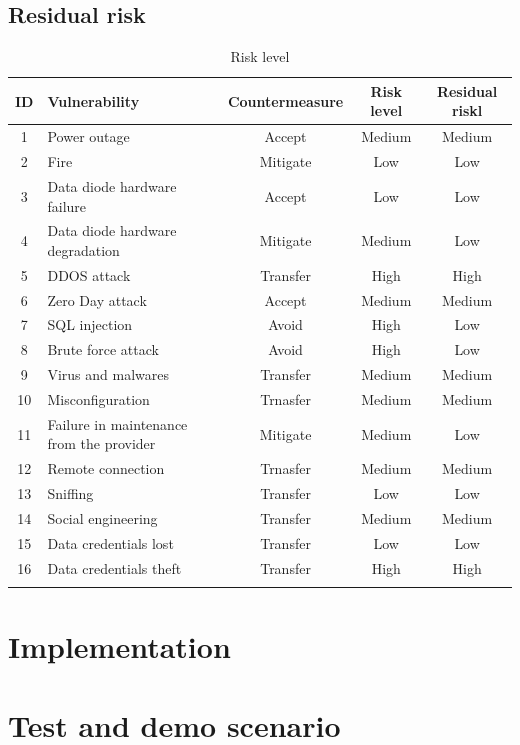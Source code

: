 \documentclass[a4paper,10pt]{article}
\begin{document}
\subsection{Residual risk}

\begin{longtable}{|c|p{4cm}|c|c|c|}
	\hline
	\textbf{ID}& \textbf{Vulnerability}  & \textbf{Countermeasure} & \textbf{Risk level} & \textbf{Residual riskl}          \\
	\hline
	1 & Power outage & Accept & Medium & Medium \\
	\hline
	2 & Fire  & Mitigate & Low & Low \\
	\hline
	3 & Data diode hardware failure & Accept & Low & Low \\
	\hline
	4 & Data diode hardware degradation & Mitigate & Medium & Low  \\
	\hline
	5 & DDOS attack & Transfer & High & High \\
	\hline
	6 & Zero Day attack & Accept & Medium & Medium \\
	\hline
	7 &  SQL injection & Avoid & High & Low \\
	\hline
	8 & Brute force attack & Avoid & High & Low \\
	\hline
	9 & Virus and malwares & Transfer & Medium & Medium \\
	\hline
	10 & Misconfiguration & Trnasfer & Medium & Medium \\
	\hline
	11 & Failure in maintenance from the provider & Mitigate & Medium & Low \\
	\hline
	12 & Remote connection & Trnasfer & Medium & Medium\\
	\hline
	13 & Sniffing & Transfer & Low & Low \\
	\hline
	14 & Social engineering & Transfer & Medium & Medium \\
	\hline
	15 & Data credentials lost & Transfer & Low & Low \\
	\hline
	16 & Data credentials theft & Transfer & High & High \\
	\hline
	\caption{Risk level}
	\label{tab:risklvl}
\end{longtable}

\section{Implementation}

\section{Test and demo scenario}
\end{document}
